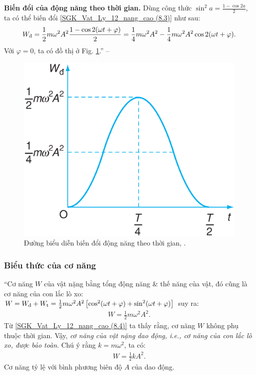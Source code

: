 \documentclass{article}
\numberwithin{equation}{section}
\begin{document}
\textbf{Biến đổi của động năng theo thời gian.} Dùng công thức $\sin^2a = \frac{1 - \cos2a}{2}$, ta có thể biến đổi \eqref{SGK_Vat_Ly_12_nang_cao (8.3)} như sau:
\begin{align*}
	W_{\mbox{\scriptsize\rm đ}} = \frac{1}{2}m\omega^2A^2\frac{1 - \cos2(\omega t + \varphi)}{2} = \frac{1}{4}m\omega^2A^2 - \frac{1}{4}m\omega^2A^2\cos2(\omega t + \varphi).
\end{align*}
Với $\varphi = 0$, ta có đồ thị ở Fig. \ref{fig:duong_bieu_dien_bien_doi_dong_nang_theo_thoi_gian}.'' -- \cite[p. 42]{SGK_Vat_Ly_12_nang_cao}

\begin{figure}[H]
	\centering
	\includegraphics[scale=0.15]{duong_bieu_dien_bien_doi_dong_nang_theo_thoi_gian}
	\caption{Đường biểu diễn biến đổi động năng theo thời gian, \cite[Hình 8.2, p. 42]{SGK_Vat_Ly_12_nang_cao}.}
	\label{fig:duong_bieu_dien_bien_doi_dong_nang_theo_thoi_gian}
\end{figure}

\subsubsection{Biểu thức của cơ năng}
``Cơ năng $W$ của vật nặng bằng tổng động năng \& thế năng của vật, đó cũng là cơ năng của con lắc lò xo: $W = W_{\mbox{\scriptsize\rm đ}} + W_{\rm t} = \frac{1}{2}m\omega^2A^2\left[\cos^2(\omega t + \varphi) + \sin^2(\omega t + \varphi)\right]$ suy ra:
\begin{align}
	\label{SGK_Vat_Ly_12_nang_cao (8.4)}
	W = \frac{1}{2}m\omega^2A^2.
\end{align}
Từ \eqref{SGK_Vat_Ly_12_nang_cao (8.4)} ta thấy rằng, cơ năng $W$ không phụ thuộc thời gian. Vậy, \textit{cơ năng của vật nặng dao động, i.e., cơ năng của con lắc lò xo, được bảo toàn}. Chú ý rằng $k = m\omega^2$, ta có:
\begin{align}
	\label{SGK_Vat_Ly_12_nang_cao (8.5)}
	W = \frac{1}{2}kA^2.
\end{align}
Cơ năng tỷ lệ với bình phương biên độ $A$ của dao động.
\end{document}
